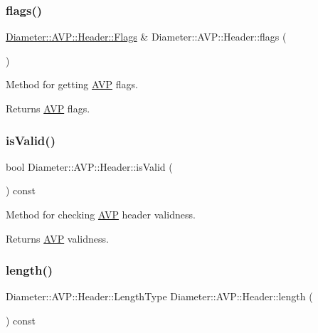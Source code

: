 \subsubsection{\texorpdfstring{flags()}{flags()}\hspace{0.1cm}{\footnotesize\ttfamily [2/2]}}
{\footnotesize\ttfamily \hyperlink{classDiameter_1_1AVP_1_1Header_1_1Flags}{Diameter\+::\+A\+V\+P\+::\+Header\+::\+Flags} \& Diameter\+::\+A\+V\+P\+::\+Header\+::flags (\begin{DoxyParamCaption}{ }\end{DoxyParamCaption})}



Method for getting \hyperlink{classDiameter_1_1AVP}{A\+VP} flags. 

\begin{DoxyReturn}{Returns}
\hyperlink{classDiameter_1_1AVP}{A\+VP} flags. 
\end{DoxyReturn}
\mbox{\label{classDiameter_1_1AVP_1_1Header_a9c752aeb95b034a3172367d0da0be0c8}} 
\subsubsection{\texorpdfstring{is\+Valid()}{isValid()}}
{\footnotesize\ttfamily bool Diameter\+::\+A\+V\+P\+::\+Header\+::is\+Valid (\begin{DoxyParamCaption}{ }\end{DoxyParamCaption}) const}



Method for checking \hyperlink{classDiameter_1_1AVP}{A\+VP} header validness. 

\begin{DoxyReturn}{Returns}
\hyperlink{classDiameter_1_1AVP}{A\+VP} validness. 
\end{DoxyReturn}
\mbox{\label{classDiameter_1_1AVP_1_1Header_a9a097c1c12f4e81cc47b980a32e2881c}} 
\subsubsection{\texorpdfstring{length()}{length()}\hspace{0.1cm}{\footnotesize\ttfamily [1/2]}}
{\footnotesize\ttfamily Diameter\+::\+A\+V\+P\+::\+Header\+::\+Length\+Type Diameter\+::\+A\+V\+P\+::\+Header\+::length (\begin{DoxyParamCaption}{ }\end{DoxyParamCaption}) const}



